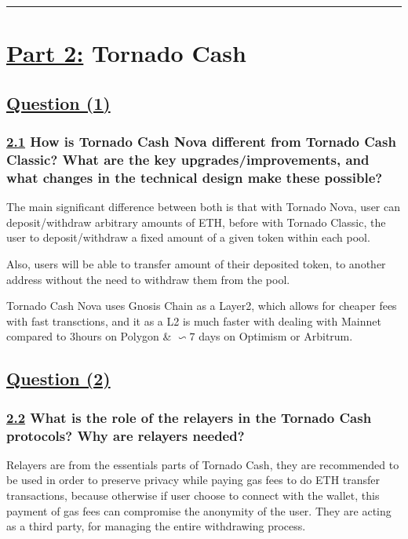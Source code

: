 \documentclass[letterpaper, 10 pt, conference]{ieeeconf}  %
\begin{document}
\noindent\rule{8cm}{0.4pt}

\newpage

\section{\textbf{\underline{Part 2:}} Tornado Cash}
\subsection{\textbf{\underline{Question (1)}}}
\subsubsection{\textbf{\underline{2.1} How is Tornado Cash Nova different from Tornado Cash Classic? What are the key upgrades/improvements, and what changes in the technical design make these possible?}}

The main significant difference between both is that with Tornado Nova, user can deposit/withdraw arbitrary amounts of ETH, before with Tornado Classic, the user to deposit/withdraw a fixed amount of a given token within each pool. 

Also, users will be able to transfer amount of their deposited token, to another address without the need to withdraw them from the pool. 

Tornado Cash Nova uses Gnosis Chain as a Layer2, which allows for cheaper fees with fast transctions, and it as a L2 is much faster with dealing with Mainnet compared to 3hours on Polygon \& $\backsim 7$  days on Optimism or Arbitrum. 


\subsection{\textbf{\underline{Question (2)}}}
\subsubsection{\textbf{\underline{2.2} What is the role of the relayers in the Tornado Cash protocols? Why are relayers needed?}}

Relayers are from the essentials parts of Tornado Cash, they are recommended to be used in order to preserve privacy while paying gas fees to do ETH transfer transactions, because otherwise if user choose to connect with the wallet, this payment of gas fees can compromise the anonymity of the user. 
They are acting as a third party, for managing the entire withdrawing process. \cite{c1} 
\end{document}
